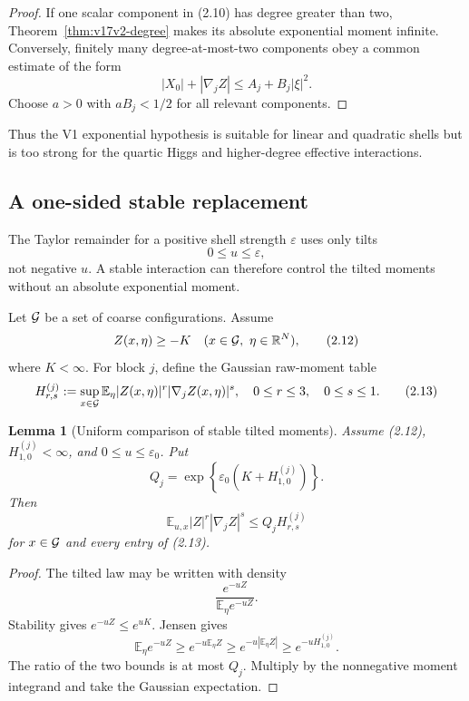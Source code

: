 \documentclass[11pt]{article}
\newtheorem{lemma}[theorem]{Lemma}
\theoremstyle{remark}
\begin{document}
\begin{proof}
If one scalar component in (2.10) has degree greater than two,
Theorem~\ref{thm:v17v2-degree} makes its absolute exponential moment
infinite.  Conversely, finitely many degree-at-most-two components
obey a common estimate of the form
\[
 |X_0|+|\nabla_jZ|\leq A_j+B_j|\xi|^2.
\]
Choose \(a>0\) with \(aB_j<1/2\) for all relevant components.
\end{proof}

Thus the V1 exponential hypothesis is suitable for linear and
quadratic shells but is too strong for the quartic Higgs and
higher-degree effective interactions.

\subsection{A one-sided stable replacement}

The Taylor remainder for a positive shell strength
\(\varepsilon\) uses only tilts
\[
 0\leq u\leq\varepsilon,                            \tag{2.11}
\]
not negative \(u\).  A stable interaction can therefore control the
tilted moments without an absolute exponential moment.

Let \({\cal G}\) be a set of coarse configurations.  Assume
\[
 Z(x,\eta)\geq-K
 \quad(x\in{\cal G},\ \eta\in\mathbb R^N),           \tag{2.12}
\]
where \(K<\infty\).  For block \(j\), define the Gaussian raw-moment
table
\[
 H_{r,s}^{(j)}
 :=
 \sup_{x\in{\cal G}}
 {\mathbb E}_\eta
 |Z(x,\eta)|^r|\nabla_jZ(x,\eta)|^s,
 \quad
 0\leq r\leq3,\quad0\leq s\leq1.                   \tag{2.13}
\]

\begin{lemma}[Uniform comparison of stable tilted moments]
\label{lem:v17v2-tilt}
Assume (2.12), \(H_{1,0}^{(j)}<\infty\), and
\(0\leq u\leq\varepsilon_0\).  Put
\[
 Q_j=
 \exp\left\{
 \varepsilon_0(K+H_{1,0}^{(j)})
 \right\}.                                         \tag{2.14}
\]
Then
\[
 {\mathbb E}_{u,x}
 |Z|^r|\nabla_jZ|^s
 \leq Q_jH_{r,s}^{(j)}                              \tag{2.15}
\]
for \(x\in{\cal G}\) and every entry of (2.13).
\end{lemma}

\begin{proof}
The tilted law may be written with density
\[
 \frac{e^{-uZ}}{{\mathbb E}_\eta e^{-uZ}}.
\]
Stability gives \(e^{-uZ}\leq e^{uK}\).  Jensen gives
\[
 {\mathbb E}_\eta e^{-uZ}
 \geq e^{-u{\mathbb E}_\eta Z}
 \geq e^{-u|{\mathbb E}_\eta Z|}
 \geq e^{-uH_{1,0}^{(j)}}.                          \tag{2.16}
\]
The ratio of the two bounds is at most \(Q_j\).  Multiply by the
nonnegative moment integrand and take the Gaussian expectation.
\end{proof}
\end{document}
